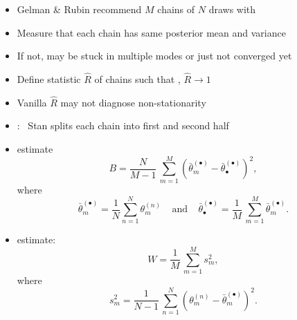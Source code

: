 \documentclass[10pt]{report}
\begin{document}
%
\begin{itemize}
\item Gelman \& Rubin recommend $M$ chains of $N$ draws with
\item Measure that each chain has same posterior mean and variance
\item If not, may be stuck in multiple modes or just not converged yet
\item Define statistic $\hat{R}$ of chains such that ,
$\hat{R} \rightarrow 1$
\end{itemize}


\begin{itemize}
\item Vanilla $\hat{R}$ may not diagnose non-stationarity
\item {}: \ Stan splits each chain into first and
  second half
\end{itemize}


%
\begin{itemize}
\item {} estimate
\[\textstyle
B
= \frac{N}{M-1} \, \sum_{m=1}^M (\bar{\theta}^{(\bullet)}_{m} - \bar{\theta}^{(\bullet)}_{\bullet})^2,
\]
%
where
%
\[\textstyle
\bar{\theta}_m^{(\bullet)}
= \frac{1}{N} \sum_{n = 1}^N \theta_m^{(n)}
\ \ \ \ \
\mbox{and}
\ \ \ \ \
\bar{\theta}^{(\bullet)}_{\bullet}
= \frac{1}{M} \, \sum_{m=1}^M \bar{\theta}_m^{(\bullet)}.
\]
\vspace*{6pt}
\item {} estimate:
\[\textstyle
W
= \frac{1}{M} \, \sum_{m=1}^M s_m^2,
\]
where
\[\textstyle
s_m^2 = \frac{1}{N-1} \, \sum_{n=1}^N (\theta^{(n)}_m - \bar{\theta}^{(\bullet)}_m)^2.
\]
\end{itemize}
\end{document}
